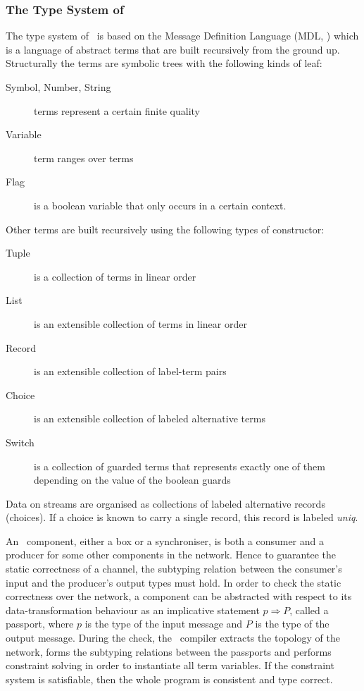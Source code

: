     \subsubsection{The Type System of \ak\ }
The type system of \ak\ is based on the Message Definition Language (MDL, \cite{astrakahn}) which is a language of abstract terms that are built recursively from the ground up. Structurally the terms are symbolic trees with the following kinds of leaf:
\begin{description}
\item[Symbol, Number, String] terms represent a certain finite quality
\item[Variable] term ranges over terms
\item[Flag] is a boolean variable that only occurs in a certain context.
\end{description}
Other terms are built recursively using the following types of constructor:
\begin{description}
\item[Tuple] is a collection of terms in linear order
\item[List] is an extensible collection of terms in linear order
\item[Record] is an extensible collection of label-term pairs
\item[Choice] is an extensible collection of labeled alternative terms
\item[Switch] is a collection of guarded terms that represents exactly one of them depending on the value of the boolean guards
\end{description}

Data on streams are organised as collections of labeled alternative records (choices). If a choice is known to carry a single record, this record is labeled \emph{uniq}.

An \ak\ component, either a box or a synchroniser, is both a consumer and a producer for some other components in the network. Hence to guarantee the static correctness of a channel, the subtyping relation between the consumer's input and the producer's output types must hold. In order to check the static correctness over the network, a component can be abstracted with respect to its data-transformation behaviour as an implicative statement $p \Rightarrow P$, called a passport, where $p$ is the type of the input message and $P$ is the type of the output message. During the check, the \ak\ compiler extracts the topology of the network, forms the subtyping relations between the passports and performs constraint solving in order to instantiate all term variables. If the constraint system is satisfiable, then the whole program is consistent and type correct.


